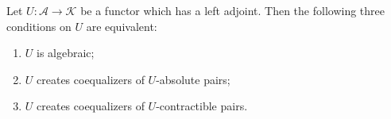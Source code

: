 Let $U: \mathcal{A} \longrightarrow \mathcal{K}$ be a functor which has a left adjoint. Then the following three conditions on $U$ are equivalent:
\begin{enumerate}
\item $U$ is algebraic;
\item $U$ creates coequalizers of $U$-absolute pairs;
\item $U$ creates coequalizers of $U$-contractible pairs.
\end{enumerate}
